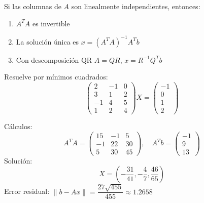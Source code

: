 \begin{theorem}
Si las columnas de $A$ son linealmente independientes, entonces:
\begin{enumerate}
    \item $A^T A$ es invertible
    \item La solución única es $x = (A^T A)^{-1} A^T b$
    \item Con descomposición QR $A = QR$, $x = R^{-1} Q^T b$
\end{enumerate}
\end{theorem}

\begin{example}
Resuelve por mínimos cuadrados:
\[
\begin{pmatrix}
2 & -1 & 0 \\
3 & 1 & 2 \\
-1 & 4 & 5 \\
1 & 2 & 4
\end{pmatrix}
X = 
\begin{pmatrix} -1 \\ 0 \\ 1 \\ 2 \end{pmatrix}
\]
\begin{myproof}
Cálculos:
\[
A^T A = \begin{pmatrix}
15 & -1 & 5 \\
-1 & 22 & 30 \\
5 & 30 & 45
\end{pmatrix}, \quad
A^T b = \begin{pmatrix} -1 \\ 9 \\ 13 \end{pmatrix}
\]
Solución:
\[
X = \left( -\dfrac{31}{41}, -\dfrac{4}{7}, \dfrac{46}{65} \right)
\]
Error residual: $\|b - Ax\| = \dfrac{27 \sqrt{455}}{455} \approx 1.2658$
\end{myproof}
\end{example}




